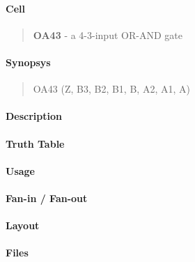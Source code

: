 \label{OA43}
\paragraph{Cell}
\begin{quote}
    \textbf{OA43} - a 4-3-input OR-AND gate
\end{quote}

\paragraph{Synopsys}
\begin{quote}
    OA43 (Z, B3, B2, B1, B, A2, A1, A)
\end{quote}

\paragraph{Description}

%

\paragraph{Truth Table}
%

\paragraph{Usage}

\paragraph{Fan-in / Fan-out}

\paragraph{Layout}

\paragraph{Files}
